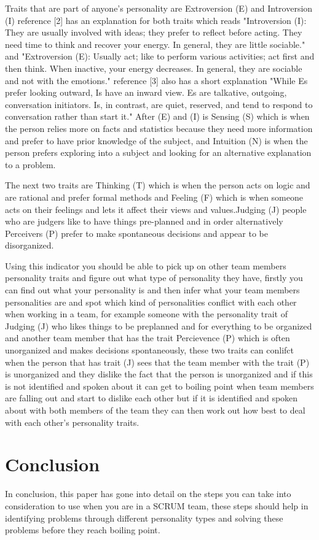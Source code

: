 \documentclass{scrartcl}
\begin{document}
Traits that are part of anyone's personality are Extroversion (E) and Introversion (I) reference [2] has an explanation for both traits which reads "Introversion (I): They are usually involved with ideas; they prefer to reflect before acting. They need time to think and recover your energy. In general, they are little sociable." and "Extroversion (E): Usually act; like to perform various activities; act first and then think. When inactive, your energy decreases. In general, they are sociable and not with the emotions." reference [3] also has a short explanation "While Es prefer looking outward, Is have an inward view. Es are talkative, outgoing,	conversation initiators. Is, in contrast, are quiet, reserved, and tend to respond to conversation rather than start it." After (E) and (I) is Sensing (S) which is when the person relies more on facts and statistics because they need more information and prefer to have prior knowledge of the subject, and Intuition (N) is when the person prefers exploring into a subject and looking for an alternative explanation to a problem.

The next two traits are Thinking (T) which is when the person acts on logic and are rational and prefer formal methods and Feeling (F) which is when someone acts on their feelings and lets it affect their views and values.Judging (J) people who are judgers like to have things pre-planned and in order alternatively Perceivers (P) prefer to make spontaneous decisions and appear to be disorganized.

Using this indicator you should be able to pick up on other team members personality traits and figure out what type of personality they have, firstly you can find out what your personality is and then infer what your team members personalities are and spot which kind of personalities conflict with each other when working in a team, for example someone with the personality trait of Judging (J) who likes things to be preplanned and for everything to be organized and another team member that has the trait Percievence (P) which is often unorganized and makes decisions spontaneously, these two traits can conlifct when the person that has trait (J) sees that the team member with the trait (P) is unorganized and they dislike the fact that the person is unorganized and if this is not identified and spoken about it can get to boiling point when team members are falling out and start to dislike each other but if it is identified and spoken about with both members of the team  they can then work out how best to deal with each other's personality traits. 


\section{Conclusion}

In conclusion, this paper has gone into detail on the steps you can take into consideration to use when you are in a SCRUM team, these steps should help in identifying problems through different personality types and solving these problems before they reach boiling point.



\end{document}

